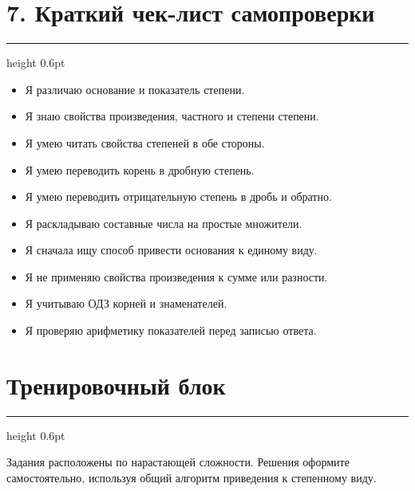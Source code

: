 \documentclass[a4paper,12pt]{article}
\newcommand{\sectionline}{
  \par
  \vspace{0.2em}
  {\color{accent}\hrule height 0.6pt}
  \vspace{0.8em}
}
\newcommand{\checkitem}[1]{\item[$\square$] #1}
\begin{document}

\section*{7. Краткий чек-лист самопроверки}
\sectionline

\begin{itemize}

  \checkitem{
  Я различаю основание и показатель степени.
  }

  \checkitem{
  Я знаю свойства произведения, частного и степени степени.
  }

  \checkitem{
  Я умею читать свойства степеней в обе стороны.
  }

  \checkitem{
  Я умею переводить корень в дробную степень.
  }

  \checkitem{
  Я умею переводить отрицательную степень в дробь и обратно.
  }

  \checkitem{
  Я раскладываю составные числа на простые множители.
  }

  \checkitem{
  Я сначала ищу способ привести основания к единому виду.
  }

  \checkitem{
  Я не применяю свойства произведения к сумме или разности.
  }

  \checkitem{
  Я учитываю ОДЗ корней и знаменателей.
  }

  \checkitem{
  Я проверяю арифметику показателей перед записью ответа.
  }

\end{itemize}


\clearpage

\section*{Тренировочный блок}
\sectionline

Задания расположены по нарастающей сложности.
Решения оформите самостоятельно, используя общий алгоритм приведения к
степенному виду.
\end{document}
